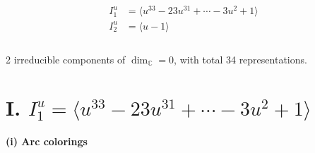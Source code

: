 \documentclass[1p]{elsarticle_modified}
\theoremstyle{definition}
\begin{document}
\begin{align*}
I^u_{1}&=\langle 
u^{33}-23 u^{31}+\cdots-3 u^2+1\rangle \\
I^u_{2}&=\langle 
u-1\rangle \\
\\
\end{align*}
\raggedright * 2 irreducible components of $\dim_{\mathbb{C}}=0$, with total 34 representations.\\
\newpage
\renewcommand{\arraystretch}{1}
\centering \section*{I. $I^u_{1}= \langle u^{33}-23 u^{31}+\cdots-3 u^2+1 \rangle$}
\flushleft \textbf{(i) Arc colorings}\\
\end{document}
